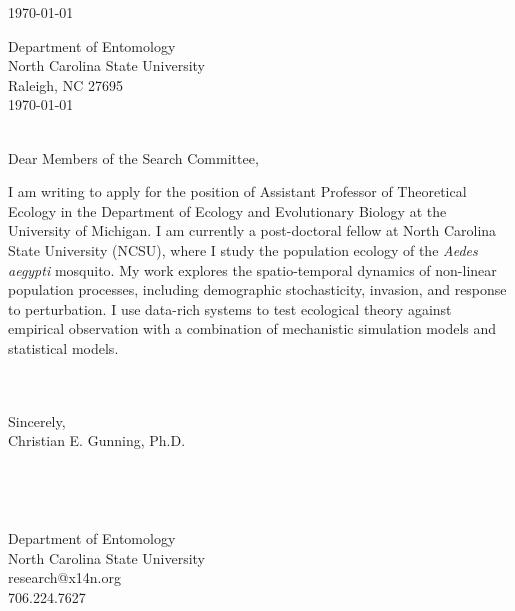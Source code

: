 \documentclass[11pt]{article}
\begin{document}
\thispagestyle{empty}

\begin{flushleft}
\today

Department of Entomology\\
North Carolina State University\\
Raleigh, NC 27695\\
\today
\end{flushleft}

~\\
Dear Members of the Search Committee,

I am writing to apply for the position of Assistant Professor of Theoretical
Ecology in the Department of Ecology and Evolutionary Biology at the University of
Michigan.  I am currently a post-doctoral fellow at North Carolina State
University (NCSU), where I study the population ecology of the {\em Aedes
aegypti} mosquito. My work explores the spatio-temporal dynamics of non-linear
population processes, including demographic stochasticity, invasion,
and response to perturbation. I use data-rich systems to test ecological
theory against empirical observation with a combination of mechanistic
simulation models and statistical models.

~\\
~\\
Sincerely,\\
Christian E. Gunning, Ph.D.\\
~\\
~\\
~\\
~\\
Department of Entomology \\
North Carolina State University \\
research@x14n.org \\
706.224.7627 \\
\end{document}
